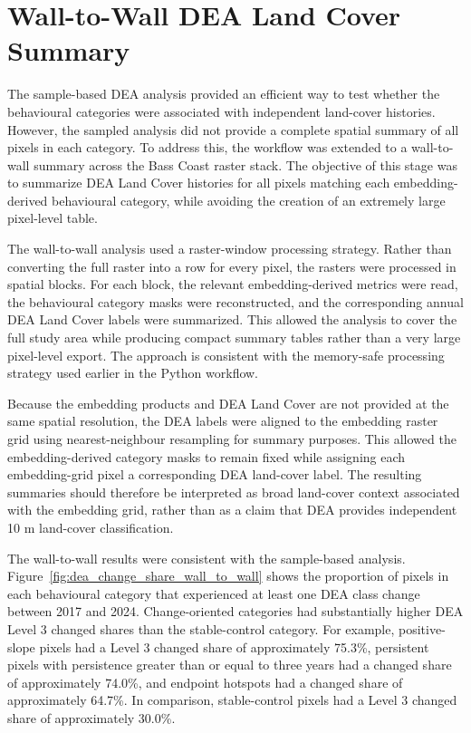 \documentclass[11pt,a4paper]{article}
\begin{document}
\section{Wall-to-Wall DEA Land Cover Summary}

The sample-based DEA analysis provided an efficient way to test whether the behavioural categories were associated with independent land-cover histories. However, the sampled analysis did not provide a complete spatial summary of all pixels in each category. To address this, the workflow was extended to a wall-to-wall summary across the Bass Coast raster stack. The objective of this stage was to summarize DEA Land Cover histories for all pixels matching each embedding-derived behavioural category, while avoiding the creation of an extremely large pixel-level table.

The wall-to-wall analysis used a raster-window processing strategy. Rather than converting the full raster into a row for every pixel, the rasters were processed in spatial blocks. For each block, the relevant embedding-derived metrics were read, the behavioural category masks were reconstructed, and the corresponding annual DEA Land Cover labels were summarized. This allowed the analysis to cover the full study area while producing compact summary tables rather than a very large pixel-level export. The approach is consistent with the memory-safe processing strategy used earlier in the Python workflow.

Because the embedding products and DEA Land Cover are not provided at the same spatial resolution, the DEA labels were aligned to the embedding raster grid using nearest-neighbour resampling for summary purposes. This allowed the embedding-derived category masks to remain fixed while assigning each embedding-grid pixel a corresponding DEA land-cover label. The resulting summaries should therefore be interpreted as broad land-cover context associated with the embedding grid, rather than as a claim that DEA provides independent 10 m land-cover classification.

The wall-to-wall results were consistent with the sample-based analysis. Figure~\ref{fig:dea_change_share_wall_to_wall} shows the proportion of pixels in each behavioural category that experienced at least one DEA class change between 2017 and 2024. Change-oriented categories had substantially higher DEA Level 3 changed shares than the stable-control category. For example, positive-slope pixels had a Level 3 changed share of approximately 75.3\%, persistent pixels with persistence greater than or equal to three years had a changed share of approximately 74.0\%, and endpoint hotspots had a changed share of approximately 64.7\%. In comparison, stable-control pixels had a Level 3 changed share of approximately 30.0\%.
\end{document}
